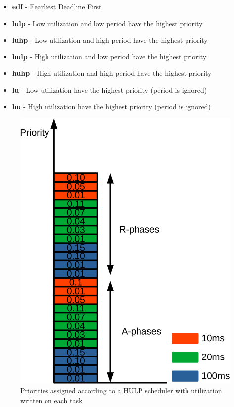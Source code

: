\documentclass{kththesis}
\begin{document}
\begin{itemize}
    \item \textbf{\acrshort{edf}} - Eearliest Deadline First
    \item \textbf{\acrshort{lulp}} - Low utilization and low period have the highest priority
    \item \textbf{\acrshort{luhp}} - Low utilization and high period have the highest priority
    \item \textbf{\acrshort{hulp}} - High utilization and low period have the highest priority
    \item \textbf{\acrshort{huhp}} - High utilization and high period have the highest priority
    \item \textbf{\acrshort{lu}} - Low utilization have the highest priority (period is ignored)
    \item \textbf{\acrshort{hu}} - High utilization have the highest priority (period is ignored)
\end{itemize}

\begin{figure}

    \centering

    \includegraphics[width=0.8\linewidth]{images/scheduling_priorities.pdf}

    \caption{Priorities assigned according to a HULP scheduler with utilization written on each task}

    \label{fig:scheduling_priorities}

\end{figure}
\end{document}

